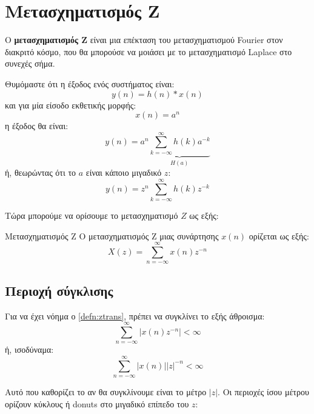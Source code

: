 \documentclass[11pt,a4paper,notitlepage,fleqn]{article}
\begin{document}
\section{Μετασχηματισμός Z}
Ο \textbf{μετασχηματισμός Z} είναι μια επέκταση του μετασχηματισμού Fourier στον διακριτό κόσμο, που
θα μπορούσε να μοιάσει με το μετασχηματισμό Laplace στο συνεχές σήμα.

Θυμόμαστε ότι η έξοδος ενός συστήματος είναι:
\[
y(n) = h(n) * x(n)
\]
και για μία είσοδο εκθετικής μορφής:
\[
x(n) =a^n
\]
η έξοδος θα είναι:
\[
y(n) = a^n \underbrace{\sum_{k=-\infty}^{\infty} h(k)a^{-k}}_{H(a)}
\]
ή, θεωρώντας ότι το \( a \) είναι κάποιο μιγαδικό \( z \):
\[
y(n) = z^n \sum_{k=-\infty}^{\infty} h(k)z^{-k}
\]

Τώρα μπορούμε να ορίσουμε το μετασχηματισμό \( Z \) ως εξής:
\begin{defn}[label=defn:ztrans]{Μετασχηματισμός Z}{}
	Ο μετασχηματισμός Z μιας συνάρτησης \( x(n) \) ορίζεται ως εξής:
	\[
	X(z) = \sum_{n=-\infty}^{\infty} x(n) z^{-n}
	\]
\end{defn}

\subsection{Περιοχή σύγκλισης}

Για να έχει νόημα ο \autoref{defn:ztrans}, πρέπει να συγκλίνει το εξής άθροισμα:
\[
\sum_{n=-\infty}^{\infty} \left| x(n)z^{-n} \right| < \infty
\]
ή, ισοδύναμα:
\[
\sum_{n=-\infty}^{\infty} \left\lvert x(n) \right\rvert \left\lvert z\right\rvert^{-n} < \infty
\]

Αυτό που καθορίζει το αν θα συγκλίνουμε είναι το μέτρο \( |z| \). Οι περιοχές ίσου μέτρου ορίζουν
κύκλους ή donuts στο μιγαδικό επίπεδο του \( z \):

\hfill
{}
\hfill
{}
\end{document}
